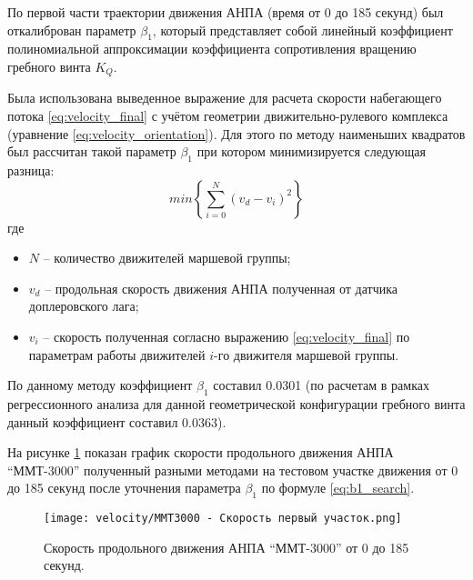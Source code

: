 
По первой части траектории движения АНПА (время от 0 до 185 секунд) был откалиброван параметр $\beta_1$, который представляет собой линейный коэффициент полиномиальной аппроксимации коэффициента сопротивления вращению гребного винта $K_Q$. 

Была использована выведенное выражение для расчета скорости набегающего потока \ref{eq:velocity_final} с учётом геометрии движительно-рулевого комплекса (уравнение \ref{eq:velocity_orientation}).
Для этого по методу наименьших квадратов был рассчитан такой параметр $\beta_1$ при котором минимизируется следующая разница:
\begin{equation}
    \label{eq:b1_search}
    min\left\{ \sum_{i=0}^N\left( v_d - v_i \right)^2 \right\}
\end{equation}
\noindent где
\begin{itemize}
    \item $N$ -- количество движителей маршевой группы;
    \item $v_d$ -- продольная скорость движения АНПА полученная от датчика доплеровского лага;
    \item $v_i$ -- скорость полученная согласно выражению \ref{eq:velocity_final} по параметрам работы движителей $i$-го движителя маршевой группы.
\end{itemize}

По данному методу коэффициент $\beta_1$ составил 0.0301 (по расчетам в рамках регрессионного анализа для данной геометрической конфигурации гребного винта данный коэффициент составил 0.0363).

На рисунке \ref{fig:mmt3000_velocity_test} показан график скорости продольного движения АНПА ``ММТ-3000'' полученный разными методами на тестовом участке движения от 0 до 185 секунд после уточнения параметра $\beta_1$ по формуле \ref{eq:b1_search}.

\begin{figure}[ht]
    \centering
    \texttt{[image: velocity/MMT3000 - Скорость первый участок.png]}
    \caption{Скорость продольного движения АНПА ``ММТ-3000'' от 0 до 185 секунд.}
    \label{fig:mmt3000_velocity_test}
\end{figure}

